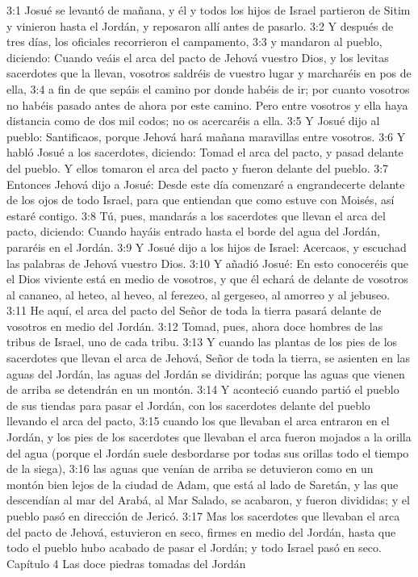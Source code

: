 3:1 Josué se levantó de mañana, y él y todos los hijos de Israel partieron de Sitim y vinieron hasta el Jordán, y reposaron allí antes de pasarlo.  
3:2 Y después de tres días, los oficiales recorrieron el campamento,  
3:3 y mandaron al pueblo, diciendo: Cuando veáis el arca del pacto de Jehová vuestro Dios, y los levitas sacerdotes que la llevan, vosotros saldréis de vuestro lugar y marcharéis en pos de ella,  
3:4 a fin de que sepáis el camino por donde habéis de ir; por cuanto vosotros no habéis pasado antes de ahora por este camino. Pero entre vosotros y ella haya distancia como de dos mil codos;  no os acercaréis a ella.  
3:5 Y Josué dijo al pueblo: Santificaos, porque Jehová hará mañana maravillas entre vosotros.  
3:6 Y habló Josué a los sacerdotes, diciendo: Tomad el arca del pacto, y pasad delante del pueblo. Y ellos tomaron el arca del pacto y fueron delante del pueblo.  
3:7 Entonces Jehová dijo a Josué: Desde este día comenzaré a engrandecerte delante de los ojos de todo Israel, para que entiendan que como estuve con Moisés, así estaré contigo.  
3:8 Tú, pues, mandarás a los sacerdotes que llevan el arca del pacto, diciendo: Cuando hayáis entrado hasta el borde del agua del Jordán, pararéis en el Jordán.  
3:9 Y Josué dijo a los hijos de Israel: Acercaos, y escuchad las palabras de Jehová vuestro Dios.  
3:10 Y añadió Josué: En esto conoceréis que el Dios viviente está en medio de vosotros, y que él echará de delante de vosotros al cananeo, al heteo, al heveo, al ferezeo, al gergeseo, al amorreo y al jebuseo.  
3:11 He aquí, el arca del pacto del Señor de toda la tierra pasará delante de vosotros en medio del Jordán.  
3:12 Tomad, pues, ahora doce hombres de las tribus de Israel, uno de cada tribu.  
3:13 Y cuando las plantas de los pies de los sacerdotes que llevan el arca de Jehová, Señor de toda la tierra, se asienten en las aguas del Jordán, las aguas del Jordán se dividirán; porque las aguas que vienen de arriba se detendrán en un montón.  
3:14 Y aconteció cuando partió el pueblo de sus tiendas para pasar el Jordán, con los sacerdotes delante del pueblo llevando el arca del pacto,  
3:15 cuando los que llevaban el arca entraron en el Jordán, y los pies de los sacerdotes que llevaban el arca fueron mojados a la orilla del agua (porque el Jordán suele desbordarse por todas sus orillas todo el tiempo de la siega),  
3:16 las aguas que venían de arriba se detuvieron como en un montón bien lejos de la ciudad de Adam, que está al lado de Saretán, y las que descendían al mar del Arabá, al Mar Salado, se acabaron, y fueron divididas; y el pueblo pasó en dirección de Jericó.  
3:17 Mas los sacerdotes que llevaban el arca del pacto de Jehová, estuvieron en seco, firmes en medio del Jordán, hasta que todo el pueblo hubo acabado de pasar el Jordán; y todo Israel pasó en seco.  
Capítulo 4
Las doce piedras tomadas del Jordán  

